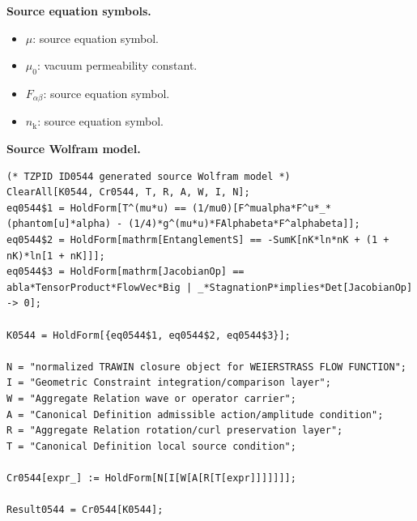 \begin{minipage}[t]{0.49\linewidth}
\begingroup
\small
\raggedright
\textbf{Source equation symbols.}\par
\begin{itemize}[leftmargin=1.35em,itemsep=1pt,topsep=1pt,parsep=0pt]
    \item $\mu$: source equation symbol.
    \item $\mu_0$: vacuum permeability constant.
    \item $F_{\alpha\beta}$: source equation symbol.
    \item $n_{\mathrm{k}}$: source equation symbol.
\end{itemize}
\endgroup
\end{minipage}\hfill
\begin{minipage}[t]{0.47\linewidth}
\begingroup
\scriptsize
\raggedright
\textbf{Source Wolfram model.}\par
\begin{Verbatim}[fontsize=\tiny,breaklines=true,breakanywhere=true]
(* TZPID ID0544 generated source Wolfram model *)
ClearAll[K0544, Cr0544, T, R, A, W, I, N];
eq0544$1 = HoldForm[T^(mu*u) == (1/mu0)[F^mualpha*F^u*_*(phantom[u]*alpha) - (1/4)*g^(mu*u)*FAlphabeta*F^alphabeta]];
eq0544$2 = HoldForm[mathrm[EntanglementS] == -SumK[nK*ln*nK + (1 + nK)*ln[1 + nK]]];
eq0544$3 = HoldForm[mathrm[JacobianOp] == abla*TensorProduct*FlowVec*Big | _*StagnationP*implies*Det[JacobianOp] -> 0];

K0544 = HoldForm[{eq0544$1, eq0544$2, eq0544$3}];

N = "normalized TRAWIN closure object for WEIERSTRASS FLOW FUNCTION";
I = "Geometric Constraint integration/comparison layer";
W = "Aggregate Relation wave or operator carrier";
A = "Canonical Definition admissible action/amplitude condition";
R = "Aggregate Relation rotation/curl preservation layer";
T = "Canonical Definition local source condition";

Cr0544[expr_] := HoldForm[N[I[W[A[R[T[expr]]]]]]];

Result0544 = Cr0544[K0544];
\end{Verbatim}
\endgroup
\end{minipage}

